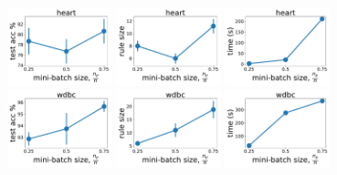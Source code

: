 \begin{figure}
	\centering
	
	\subfloat
	{\includegraphics[width=0.27\textwidth]{figures/interpretability/relaxed-cnf/heart_test_accuracy_vary_subsamplesize.pdf}}
	\subfloat
	{\includegraphics[width=0.27\textwidth]{figures/interpretability/relaxed-cnf/heart_rule_size_vary_subsamplesize.pdf}}
	\subfloat
	{\includegraphics[width=0.27\textwidth]{figures/interpretability/relaxed-cnf/heart_time_vary_subsamplesize.pdf}} 
	\\
	
	\subfloat
	{\includegraphics[width=0.27\textwidth]{figures/interpretability/relaxed-cnf/wdbc_test_accuracy_vary_subsamplesize.pdf}}
	\subfloat
	{\includegraphics[width=0.27\textwidth]{figures/interpretability/relaxed-cnf/wdbc_rule_size_vary_subsamplesize.pdf}}
	\subfloat
	{\includegraphics[width=0.27\textwidth]{figures/interpretability/relaxed-cnf/wdbc_time_vary_subsamplesize.pdf}} 
	\\
	

\end{figure}
